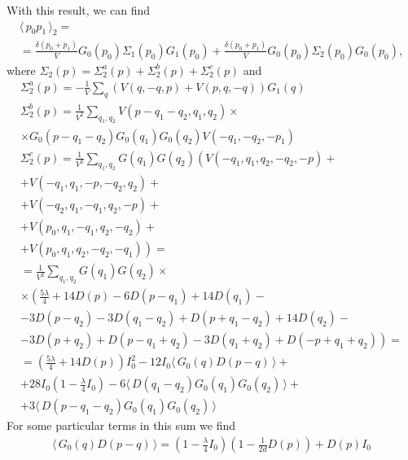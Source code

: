 \documentclass[12pt]{article}
\newcommand{\lr}[1]{ \left( #1 \right) }
\newcommand{\vev}[1]{ \langle \, #1 \, \rangle }
\begin{document}
With this result, we can find
\begin{eqnarray}
\label{G2_2}
 \vev{p_0 p_1}_2
 = \nonumber \\ =
 \frac{\delta\lr{p_0 + p_1}}{V} G_0\lr{p_0} \Sigma_1\lr{p_0} G_1\lr{p_0}
 +
 \frac{\delta\lr{p_0 + p_1}}{V} G_0\lr{p_0} \Sigma_2\lr{p_0} G_0\lr{p_0}
 ,
\end{eqnarray}
where $\Sigma_2\lr{p} = \Sigma_2^a\lr{p} + \Sigma_2^b\lr{p} + \Sigma_2^c\lr{p}$ and
\begin{eqnarray}
\label{sigma2_a}
 \Sigma_2^a\lr{p} = - \frac{1}{V} \sum\limits_q \lr{V\lr{q, -q, p} + V\lr{p, q, -q}} G_1\lr{q}
\\
\label{sigma2_b}
 \Sigma_2^b\lr{p} = \frac{1}{V^2} \sum\limits_{q_1, q_2}
 V\lr{p - q_1 - q_2, q_1, q_2}
 \times \nonumber \\ \times
 G_0\lr{p - q_1 - q_2} G_0\lr{q_1} G_0\lr{q_2}
 V\lr{-q_1, -q_2, -p_1}
\\
\label{sigma2_c}
 \Sigma_2^c\lr{p} = \frac{1}{V^2} \sum\limits_{q_1, q_2}
 G\lr{q_1} G\lr{q_2}
 \left(
  V\lr{-q_1, q_1, q_2, -q_2, -p}
  + \right. \nonumber \\ +
  V\lr{-q_1, q_1, -p, -q_2, q_2}
  + \nonumber \\ +
  V\lr{-q_2, q_1, -q_1, q_2, -p}
  + \nonumber \\ +
  V\lr{p_0, q_1, -q_1, q_2, -q_2}
  + \nonumber \\ \left. +
  V\lr{p_0, q_1, q_2, -q_2, -q_1}
 \right)
 = \nonumber \\ =
 \frac{1}{V^2} \sum\limits_{q_1, q_2}
 G\lr{q_1} G\lr{q_2}
 \times \nonumber \\ \times
 \left(
 \frac{5 \lambda }{4}
 +14 D\lr{p}
  -6 D\lr{p-q_1}
  +14 D\lr{q_1}
 - \right. \nonumber \\ -
 3 D\lr{p-q_2}
 - 3 D\lr{q_1-q_2}
  + D\lr{p+q_1-q_2}
  +14 D\lr{q_2}
  - \nonumber \\ \left. -
  3 D\lr{p+q_2}
  +D\lr{p-q_1+q_2}
  -3 D\lr{q_1+q_2}
   +D\lr{-p+q_1+q_2}
 \right)
 = \nonumber \\ =
 \lr{\frac{5 \lambda}{4} + 14 D\lr{p}} I_0^2
 - 12 I_0 \vev{G_0\lr{q} D\lr{p - q}}
 + \nonumber \\ +
 28 I_0 \lr{1 - \frac{\lambda}{4} I_0}
 - 6 \vev{D\lr{q_1 - q_2} G_0\lr{q_1} G_0\lr{q_2}}
 + \nonumber \\ +
  3 \vev{D\lr{p - q_1 - q_2} G_0\lr{q_1} G_0\lr{q_2}}
\end{eqnarray}
For some particular terms in this sum we find
\begin{eqnarray}
\label{s2c_term1}
 \vev{G_0\lr{q} D\lr{p - q}} = \lr{1 - \frac{\lambda}{4} I_0} \lr{1 - \frac{1}{2 d} D\lr{p}}
 + D\lr{p} I_0
\end{eqnarray}
\end{document}
